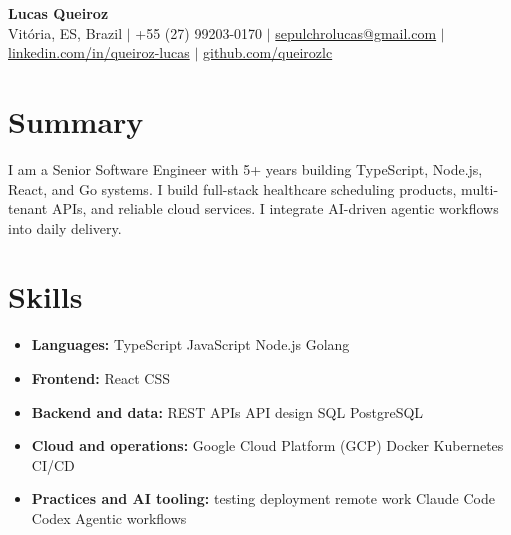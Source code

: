 \documentclass[letterpaper,10pt]{article}
\newcommand{\resumeItem}[1]{\item\small{#1}}
\newcommand{\resumeSubHeadingList}{\begin{itemize}[leftmargin=0.15in, label={}, nosep]}
\newcommand{\resumeSubHeadingListEnd}{\end{itemize}}
\begin{document}
\begin{center}
  \textbf{\Huge Lucas Queiroz} \\[3pt]
  \small Vit\'oria, ES, Brazil $|$ +55 (27) 99203-0170 $|$ \href{mailto:sepulchrolucas@gmail.com}{sepulchrolucas@gmail.com} $|$
  \href{https://linkedin.com/in/queiroz-lucas}{linkedin.com/in/queiroz-lucas} $|$
  \href{https://github.com/queirozlc}{github.com/queirozlc}
\end{center}
\vspace{2pt}

\section{Summary}
I am a Senior Software Engineer with 5+ years building TypeScript, Node.js, React, and Go systems. I build full-stack healthcare scheduling products, multi-tenant APIs, and reliable cloud services. I integrate AI-driven agentic workflows into daily delivery.

\section{Skills}
\resumeSubHeadingList
\resumeItem{\textbf{Languages:} TypeScript \textbar{} JavaScript \textbar{} Node.js \textbar{} Golang}
\resumeItem{\textbf{Frontend:} React \textbar{} CSS}
\resumeItem{\textbf{Backend and data:} REST APIs \textbar{} API design \textbar{} SQL \textbar{} PostgreSQL}
\resumeItem{\textbf{Cloud and operations:} Google Cloud Platform (GCP) \textbar{} Docker \textbar{} Kubernetes \textbar{} CI/CD}
\resumeItem{\textbf{Practices and AI tooling:} testing \textbar{} deployment \textbar{} remote work \textbar{} Claude Code \textbar{} Codex \textbar{} Agentic workflows}
\resumeSubHeadingListEnd
\end{document}
